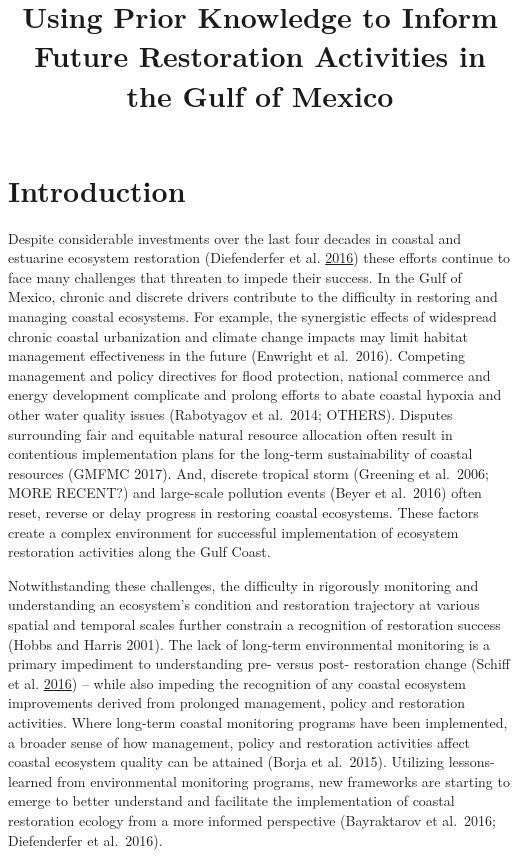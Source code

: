 \documentclass[]{article}
\title{Using Prior Knowledge to Inform Future Restoration Activities in the
Gulf of Mexico}
\author{}
\date{}
\begin{document}
\maketitle

\hypertarget{introduction}{%
\section{Introduction}\label{introduction}}

Despite considerable investments over the last four decades in coastal
and estuarine ecosystem restoration (Diefenderfer et al.
\protect\hyperlink{ref-Diefenderfer16}{2016}) these efforts continue to
face many challenges that threaten to impede their success. In the Gulf
of Mexico, chronic and discrete drivers contribute to the difficulty in
restoring and managing coastal ecosystems. For example, the synergistic
effects of widespread chronic coastal urbanization and climate change
impacts may limit habitat management effectiveness in the future
(Enwright et al.~2016). Competing management and policy directives for
flood protection, national commerce and energy development complicate
and prolong efforts to abate coastal hypoxia and other water quality
issues (Rabotyagov et al.~2014; OTHERS). Disputes surrounding fair and
equitable natural resource allocation often result in contentious
implementation plans for the long-term sustainability of coastal
resources (GMFMC 2017). And, discrete tropical storm (Greening et
al.~2006; MORE RECENT?) and large-scale pollution events (Beyer et
al.~2016) often reset, reverse or delay progress in restoring coastal
ecosystems. These factors create a complex environment for successful
implementation of ecosystem restoration activities along the Gulf Coast.

Notwithstanding these challenges, the difficulty in rigorously
monitoring and understanding an ecosystem's condition and restoration
trajectory at various spatial and temporal scales further constrain a
recognition of restoration success (Hobbs and Harris 2001). The lack of
long-term environmental monitoring is a primary impediment to
understanding pre- versus post- restoration change (Schiff et al.
\protect\hyperlink{ref-Schiff16}{2016}) -- while also impeding the
recognition of any coastal ecosystem improvements derived from prolonged
management, policy and restoration activities. Where long-term coastal
monitoring programs have been implemented, a broader sense of how
management, policy and restoration activities affect coastal ecosystem
quality can be attained (Borja et al.~2015). Utilizing lessons-learned
from environmental monitoring programs, new frameworks are starting to
emerge to better understand and facilitate the implementation of coastal
restoration ecology from a more informed perspective (Bayraktarov et
al.~2016; Diefenderfer et al.~2016).
\end{document}
